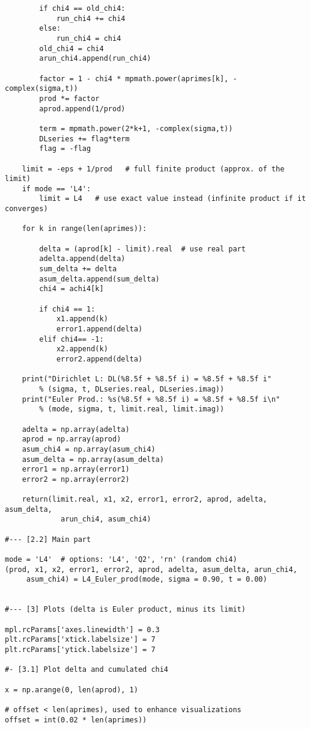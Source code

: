 \documentclass[oneside,10pt]{book}
\begin{document}
\begin{lstlisting}
        if chi4 == old_chi4:
            run_chi4 += chi4
        else:
            run_chi4 = chi4
        old_chi4 = chi4
        arun_chi4.append(run_chi4) 
 
        factor = 1 - chi4 * mpmath.power(aprimes[k], -complex(sigma,t))
        prod *= factor
        aprod.append(1/prod)    

        term = mpmath.power(2*k+1, -complex(sigma,t))
        DLseries += flag*term
        flag = -flag

    limit = -eps + 1/prod   # full finite product (approx. of the limit)
    if mode == 'L4':
        limit = L4   # use exact value instead (infinite product if it converges)
  
    for k in range(len(aprimes)): 

        delta = (aprod[k] - limit).real  # use real part
        adelta.append(delta)
        sum_delta += delta
        asum_delta.append(sum_delta)
        chi4 = achi4[k]
       
        if chi4 == 1: 
            x1.append(k)
            error1.append(delta)
        elif chi4== -1: 
            x2.append(k)
            error2.append(delta)

    print("Dirichlet L: DL(%8.5f + %8.5f i) = %8.5f + %8.5f i" 
        % (sigma, t, DLseries.real, DLseries.imag))
    print("Euler Prod.: %s(%8.5f + %8.5f i) = %8.5f + %8.5f i\n" 
        % (mode, sigma, t, limit.real, limit.imag))

    adelta = np.array(adelta)
    aprod = np.array(aprod)
    asum_chi4 = np.array(asum_chi4)  
    asum_delta = np.array(asum_delta) 
    error1 = np.array(error1)
    error2 = np.array(error2)

    return(limit.real, x1, x2, error1, error2, aprod, adelta, asum_delta, 
             arun_chi4, asum_chi4)

#--- [2.2] Main part
    
mode = 'L4'  # options: 'L4', 'Q2', 'rn' (random chi4)
(prod, x1, x2, error1, error2, aprod, adelta, asum_delta, arun_chi4, 
     asum_chi4) = L4_Euler_prod(mode, sigma = 0.90, t = 0.00)


#--- [3] Plots (delta is Euler product, minus its limit)

mpl.rcParams['axes.linewidth'] = 0.3
plt.rcParams['xtick.labelsize'] = 7
plt.rcParams['ytick.labelsize'] = 7

#- [3.1] Plot delta and cumulated chi4

x = np.arange(0, len(aprod), 1)

# offset < len(aprimes), used to enhance visualizations 
offset = int(0.02 * len(aprimes))  


\end{lstlisting}
\end{document}
